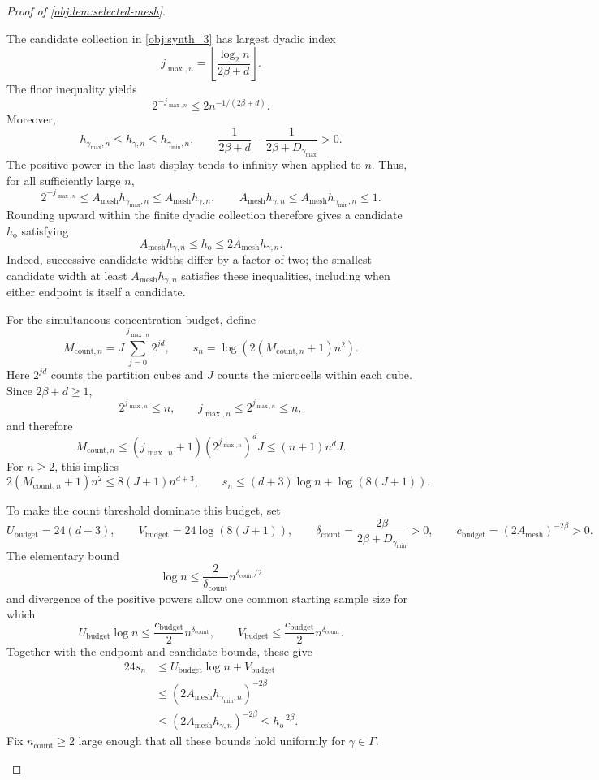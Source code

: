 \begin{proof}[Proof of \cref{obj:lem:selected-mesh}]
\begin{enumerate}
The candidate collection in \cref{obj:synth_3} has largest dyadic index
\[
j_{\max,n}
=
\left\lfloor\frac{\log_2 n}{2\beta+d}\right\rfloor.
\]
The floor inequality yields
\[
2^{-j_{\max,n}}\le 2n^{-1/(2\beta+d)}.
\]
Moreover,
\[
h_{\gamma_{\max},n}\le h_{\gamma,n}
\le h_{\gamma_{\min},n},
\qquad
\frac1{2\beta+d}-\frac1{2\beta+D_{\gamma_{\max}}}>0.
\]
The positive power in the last display tends to infinity when applied to
\(n\). Thus, for all sufficiently large \(n\),
\[
2^{-j_{\max,n}}
\le A_{\mathrm{mesh}}h_{\gamma_{\max},n}
\le A_{\mathrm{mesh}}h_{\gamma,n},
\qquad
A_{\mathrm{mesh}}h_{\gamma,n}
\le A_{\mathrm{mesh}}h_{\gamma_{\min},n}\le1.
\]
Rounding upward within the finite dyadic collection therefore gives a
candidate \(h_{\mathrm{o}}\) satisfying
\[
A_{\mathrm{mesh}}h_{\gamma,n}
\le h_{\mathrm{o}}
\le2A_{\mathrm{mesh}}h_{\gamma,n}.
\]
Indeed, successive candidate widths differ by a factor of two; the
smallest candidate width at least
\(A_{\mathrm{mesh}}h_{\gamma,n}\) satisfies these inequalities, including
when either endpoint is itself a candidate.

For the simultaneous concentration budget, define
\[
M_{\mathrm{count},n}
=
J\sum_{j=0}^{j_{\max,n}}2^{jd},
\qquad
s_n=\log\!\left(2(M_{\mathrm{count},n}+1)n^2\right).
\]
Here \(2^{jd}\) counts the partition cubes and \(J\) counts the microcells
within each cube. Since \(2\beta+d\ge1\),
\[
2^{j_{\max,n}}\le n,\qquad
j_{\max,n}\le2^{j_{\max,n}}\le n,
\]
and therefore
\[
M_{\mathrm{count},n}
\le(j_{\max,n}+1)(2^{j_{\max,n}})^dJ
\le(n+1)n^dJ.
\]
For \(n\ge2\), this implies
\[
2(M_{\mathrm{count},n}+1)n^2
\le8(J+1)n^{d+3},
\qquad
s_n\le(d+3)\log n+\log(8(J+1)).
\]

To make the count threshold dominate this budget, set
\[
U_{\mathrm{budget}}=24(d+3),\qquad
V_{\mathrm{budget}}=24\log(8(J+1)),\qquad
\delta_{\mathrm{count}}
=\frac{2\beta}{2\beta+D_{\gamma_{\min}}}>0,
\qquad
c_{\mathrm{budget}}=(2A_{\mathrm{mesh}})^{-2\beta}>0.
\]
The elementary bound
\[
\log n\le\frac{2}{\delta_{\mathrm{count}}}
n^{\delta_{\mathrm{count}}/2}
\]
and divergence of the positive powers allow one common starting sample
size for which
\[
U_{\mathrm{budget}}\log n
\le\frac{c_{\mathrm{budget}}}{2}n^{\delta_{\mathrm{count}}},
\qquad
V_{\mathrm{budget}}
\le\frac{c_{\mathrm{budget}}}{2}n^{\delta_{\mathrm{count}}}.
\]
Together with the endpoint and candidate bounds, these give
\[
\begin{aligned}
24s_n
&\le U_{\mathrm{budget}}\log n+V_{\mathrm{budget}}\\
&\le(2A_{\mathrm{mesh}}h_{\gamma_{\min},n})^{-2\beta}\\
&\le(2A_{\mathrm{mesh}}h_{\gamma,n})^{-2\beta}
\le h_{\mathrm{o}}^{-2\beta}.
\end{aligned}
\]
Fix \(n_{\mathrm{count}}\ge2\) large enough that all these bounds hold
uniformly for \(\gamma\in\Gamma\).


\end{enumerate}
\end{proof}
